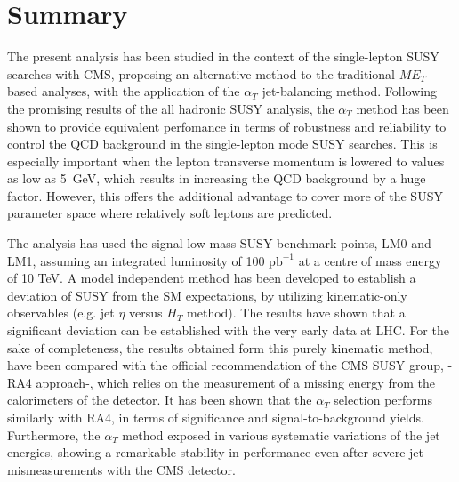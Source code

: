 \section{Summary}
\label{summary}

The present analysis has been studied in the context of the single-lepton SUSY searches with CMS, proposing an alternative method to the traditional $ME_{T}$-based analyses, with the application of the $\alpha_{T}$ jet-balancing method. Following the promising results of the all hadronic SUSY analysis, the $\alpha_{T}$ method has been shown to provide equivalent perfomance in terms of robustness and reliability to control the QCD background  in the single-lepton mode SUSY searches. This is especially important when the lepton transverse momentum is lowered to values as low as 5~GeV, which results in increasing the QCD background by a huge factor. However, this offers the additional advantage to cover more of the SUSY parameter space where relatively soft leptons are predicted.

The analysis has used the signal low mass SUSY benchmark points, LM0 and LM1, assuming an integrated luminosity of 100 $\textrm{pb}^{-1}$ at a centre of mass  energy of 10 TeV. A model independent method has been developed to establish a deviation of SUSY from the SM expectations, by utilizing kinematic-only observables (e.g. jet $\eta$ versus $H_{T}$ method). The results have shown that a significant deviation can be established with the very early data at LHC. For the sake of completeness, the results obtained form this purely kinematic method, have been compared with the official recommendation of the CMS SUSY group, - RA4 approach-, which relies on the measurement of a missing energy from the calorimeters of the detector. It has been shown that the $\alpha_{T}$ selection performs similarly with RA4, in terms of significance and signal-to-background yields. Furthermore, the $\alpha_{T}$ method exposed in various systematic variations of the jet energies, showing a remarkable stability in performance even after severe jet mismeasurements with the CMS detector.